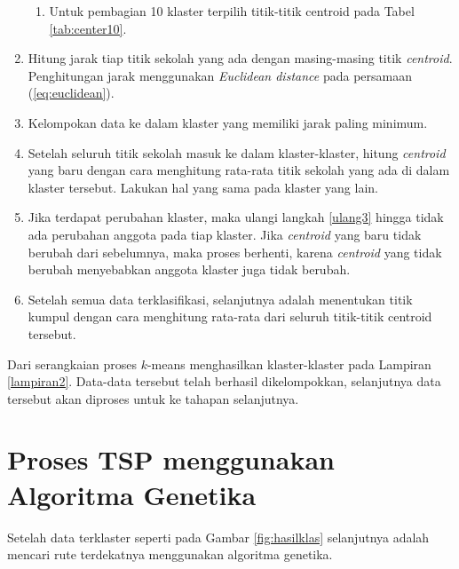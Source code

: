 \begin{enumerate}
\begin{enumerate}


	\item Untuk pembagian 10 klaster terpilih titik-titik centroid pada Tabel \ref{tab:center10}.
	

		
	\end{enumerate}

	\item \label{ulang3} Hitung jarak tiap titik sekolah yang ada dengan masing-masing titik \textit{centroid}. Penghitungan jarak menggunakan \textit{Euclidean distance} pada persamaan (\ref{eq:euclidean}).
	
	\item Kelompokan data ke dalam klaster yang memiliki jarak paling minimum.
	\item Setelah seluruh titik sekolah masuk ke dalam klaster-klaster, hitung \textit{centroid} yang baru dengan cara menghitung rata-rata titik sekolah yang ada di dalam klaster tersebut. Lakukan hal yang sama pada klaster yang lain.
	\item Jika terdapat perubahan klaster, maka ulangi langkah \ref{ulang3} hingga tidak ada perubahan anggota pada tiap klaster. Jika \textit{centroid} yang baru tidak berubah dari sebelumnya, maka proses berhenti, karena \textit{centroid} yang tidak berubah menyebabkan anggota klaster juga tidak berubah.
	
	\item Setelah semua data terklasifikasi, selanjutnya adalah menentukan titik kumpul dengan cara menghitung rata-rata dari seluruh titik-titik centroid tersebut.
\end{enumerate}

Dari serangkaian proses $k$-means menghasilkan klaster-klaster pada Lampiran \ref{lampiran2}. Data-data tersebut telah berhasil dikelompokkan, selanjutnya data tersebut akan diproses untuk ke tahapan selanjutnya.

\section{Proses TSP menggunakan Algoritma Genetika}

Setelah data terklaster seperti pada Gambar \ref{fig:hasilklas} selanjutnya adalah mencari rute terdekatnya menggunakan algoritma genetika.

